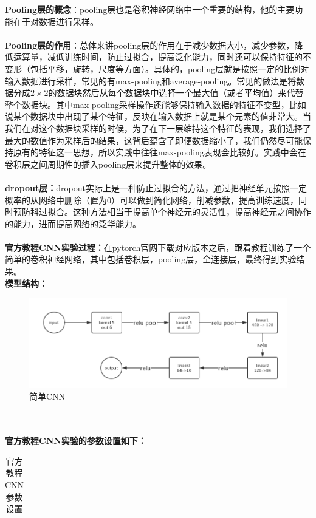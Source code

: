 \documentclass[a4paper,UTF8]{article}
\numberwithin{equation}{section}
\begin{document}
\begin{enumerate}
\textbf{Pooling层的概念}：pooling层也是卷积神经网络中一个重要的结构，他的主要功能在于对数据进行采样。\\\\
\textbf{Pooling层的作用}：总体来讲pooling层的作用在于减少数据大小，减少参数，降低运算量，减低训练时间，防止过拟合，提高泛化能力，同时还可以保持特征的不变形（包括平移，旋转，尺度等方面）。具体的，pooling层就是按照一定的比例对输入数据进行采样，常见的有max-pooling和average-pooling。常见的做法是将数据分成$2\times 2$的数据块然后从每个数据块中选择一个最大值（或者平均值）来代替整个数据块。其中max-pooling采样操作还能够保持输入数据的特征不变型，比如说某个数据块中出现了某个特征，反映在输入数据上就是某个元素的值非常大。当我们在对这个数据块采样的时候，为了在下一层维持这个特征的表现，我们选择了最大的数值作为采样后的结果，这背后蕴含了即便数据缩小了，我们仍然尽可能保持原有的特征这一思想，所以实践中往往max-pooling表现会比较好。实践中会在卷积层之间周期性的插入pooling层来提升整体的效果。\\\\
\textbf{dropout层：}dropout实际上是一种防止过拟合的方法，通过把神经单元按照一定概率的从网络中删除（置为0）可以做到简化网络，削减参数，提高训练速度，同时预防科过拟合。这种方法相当于提高单个神经元的灵活性，提高神经元之间协作的能力，进而提高网络的泛华能力。\\\\
\textbf{官方教程CNN实验过程：}在pytorch官网下载对应版本之后，跟着教程训练了一个简单的卷积神经网络，其中包括卷积层，pooling层，全连接层，最终得到实验结果。\\
\textbf{模型结构：}
\begin{figure}[!h]
	\centering   
	\includegraphics[scale=0.5]{ng1.png}  
	\caption{简单CNN} 
	\label{ng1}
\end{figure}\\\\
\textbf{官方教程CNN实验的参数设置如下：}
\begin{table}[h]
	\centering
	\caption{官方教程CNN参数设置}
	\label{cn1}
	\begin{tabular}{|l|l|l|l|l|}
		\hline

\end{tabular}
\end{table}
\end{enumerate}
\end{document}
